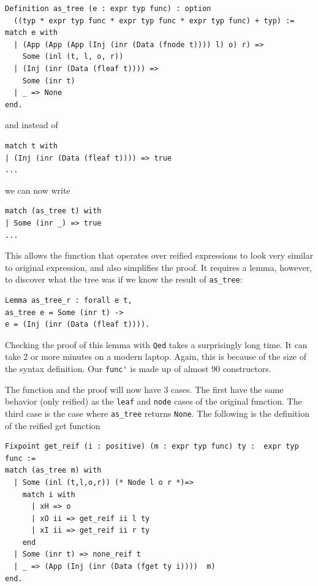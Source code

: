 \documentclass{puthesis}
\begin{document}
\begin{lstlisting}
Definition as_tree (e : expr typ func) : option
  ((typ * expr typ func * expr typ func * expr typ func) + typ) := 
match e with
  | (App (App (App (Inj (inr (Data (fnode t)))) l) o) r) =>
    Some (inl (t, l, o, r))
  | (Inj (inr (Data (fleaf t)))) =>
    Some (inr t)
  | _ => None
end.
\end{lstlisting}

and instead of 

\begin{lstlisting}
match t with
| (Inj (inr (Data (fleaf t)))) => true
...
\end{lstlisting}

we can now write

\begin{lstlisting}
match (as_tree t) with
| Some (inr _) => true
...
\end{lstlisting}

This allows the function that operates over reified expressions to look very
similar to original expression, and also simplifies the proof. It
requires a lemma, however, to discover what the tree was if we know
the result of \lstinline|as_tree|:

\begin{lstlisting}
Lemma as_tree_r : forall e t,
as_tree e = Some (inr t) ->
e = (Inj (inr (Data (fleaf t)))).
\end{lstlisting}

Checking the proof of this lemma with \lstinline|Qed| takes
a surprisingly long time. It can take 2 or more minutes on a modern
laptop. Again, this is because of the size of the syntax definition.
Our \lstinline|func'| is made up of almost 90 constructors.

The function and the proof will now have 3 cases. The first have the
same behavior (only reified) as the \lstinline|leaf| and
\lstinline|node| cases of the original function. The third case is the
case where \lstinline|as_tree| returns \lstinline|None|. The following is the
definition of the reified get function

\begin{lstlisting}
Fixpoint get_reif (i : positive) (m : expr typ func) ty :  expr typ func :=
match (as_tree m) with
  | Some (inl (t,l,o,r)) (* Node l o r *)=>
    match i with 
      | xH => o
      | xO ii => get_reif ii l ty 
      | xI ii => get_reif ii r ty 
    end
  | Some (inr t) => none_reif t
  | _ => (App (Inj (inr (Data (fget ty i))))  m)
end.
\end{lstlisting}
\end{document}

